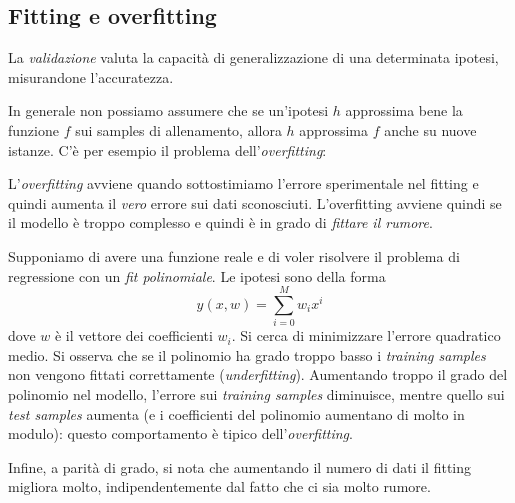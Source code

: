 

\subsection{Fitting e overfitting}

\begin{definition}[Validazione]
La \emph{validazione} valuta la capacità di generalizzazione di una determinata ipotesi, misurandone l'accuratezza.
\end{definition}


In generale non possiamo assumere che se un'ipotesi $h$ approssima bene la funzione $f$ sui samples di allenamento, allora $h$ approssima $f$ anche su nuove istanze. C'è per esempio il problema dell'\emph{overfitting}:
\begin{definition}[Overfitting]
L'\emph{overfitting} avviene quando sottostimiamo l'errore sperimentale nel fitting e quindi aumenta il \emph{vero} errore sui dati sconosciuti. L'overfitting avviene quindi se il modello è troppo complesso e quindi è in grado di \emph{fittare il rumore}.
\end{definition}

\begin{example}
Supponiamo di avere una funzione reale e di voler risolvere il problema di regressione con un \emph{fit polinomiale}. Le ipotesi sono della forma \begin{equation}
y(x,w)=\sum_{i=0}^M w_ix^i
\end{equation}
dove $w$ è il vettore dei coefficienti $w_i$. Si cerca di minimizzare l'errore quadratico medio. Si osserva che se il polinomio ha grado troppo basso i \emph{training samples} non vengono fittati correttamente (\emph{underfitting}). Aumentando troppo il grado del polinomio nel modello, l'errore sui \emph{training samples} diminuisce, mentre quello sui \emph{test samples} aumenta (e i coefficienti del polinomio aumentano di molto in modulo): questo comportamento è tipico dell'\emph{overfitting}.

Infine, a parità di grado, si nota che aumentando il numero di dati il fitting migliora molto, indipendentemente dal fatto che ci sia molto rumore.
\end{example}

